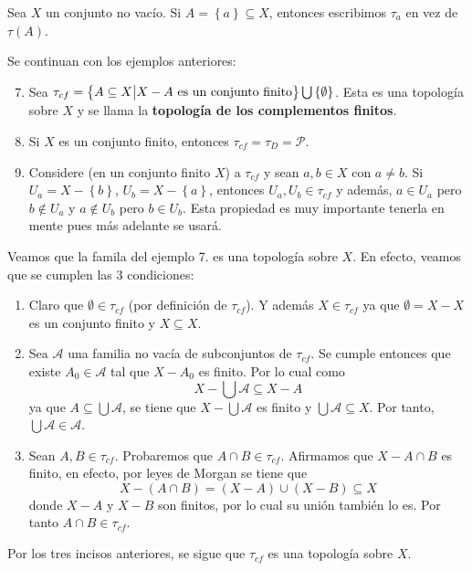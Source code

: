 \documentclass[12pt]{report}
\theoremstyle{largebreak}
\begin{document}
    \begin{obs}
        Sea $X$ un conjunto no vacío. Si $A=\left\{a\right\}\subseteq X$, entonces escribimos $\tau_a$ en vez de $\tau\left(A\right)$.
    \end{obs}

    \setcounter{exa}{0}
    \begin{exa}
        Se continuan con los ejemplos anteriores:
        \begin{enumerate}
            \setcounter{enumi}{6}
            \item Sea $\tau_{cf}=\left\{A\subseteq X\big| X-A\textup{ es un conjunto finito} \right\}\bigcup\left\{\emptyset\right\}$. Esta es una topología sobre $X$ y se llama la \textbf{topología de los complementos finitos}.
            \item Si $X$ es un conjunto finito, entonces $\tau_{cf}=\tau_D=\mathcal{P}$.
            \item Considere (en un conjunto finito $X$) a $\tau_{cf}$ y sean $a,b\in X$ con $a\neq b$. Si $U_a=X-\left\{b\right\}$, $U_b=X-\left\{a\right\}$, entonces $U_a,U_b\in\tau_{cf}$ y además, $a\in U_a$ pero $b\notin U_a$ y $a\notin U_b$ pero $b\in U_b$. Esta propiedad es muy importante tenerla en mente pues más adelante se usará.
        \end{enumerate}
    \end{exa}

    \begin{sol}
        Veamos que la famila del ejemplo 7. es una topología sobre $X$. En efecto, veamos que se cumplen las 3 condiciones:
        \begin{enumerate}
            \item Claro que $\emptyset\in\tau_{cf}$ (por definición de $\tau_{cf}$). Y además $X\in\tau_{cf}$ ya que $\emptyset=X-X$ es un conjunto finito y $X\subseteq X$.
            \item Sea $\mathcal{A}$ una familia no vacía de subconjuntos de $\tau_{cf}$. Se cumple entonces que existe $A_0\in\mathcal{A}$ tal que $X-A_0$ es finito. Por lo cual como
            \begin{equation*}
                X-\bigcup\mathcal{A}\subseteq X-A
            \end{equation*}
            ya que $A\subseteq\bigcup\mathcal{A}$, se tiene que $X-\bigcup\mathcal{A}$ es finito y $\bigcup\mathcal{A}\subseteq X$. Por tanto, $\bigcup\mathcal{A}\in\mathcal{A}$.
            \item Sean $A,B\in\tau_{cf}$. Probaremos que $A\cap B\in\tau_{cf}$. Afirmamos que $X-A\cap B$ es finito, en efecto, por leyes de Morgan se tiene que
            \begin{equation*}
                X-(A\cap B)=(X-A)\cup(X-B)\subseteq X
            \end{equation*}
            donde $X-A$ y $X-B$ son finitos, por lo cual su unión también lo es. Por tanto $A\cap B\in\tau_{cf}$.
        \end{enumerate}
        Por los tres incisos anteriores, se sigue que $\tau_{cf}$ es una topología sobre $X$.
    \end{sol}
\end{document}

